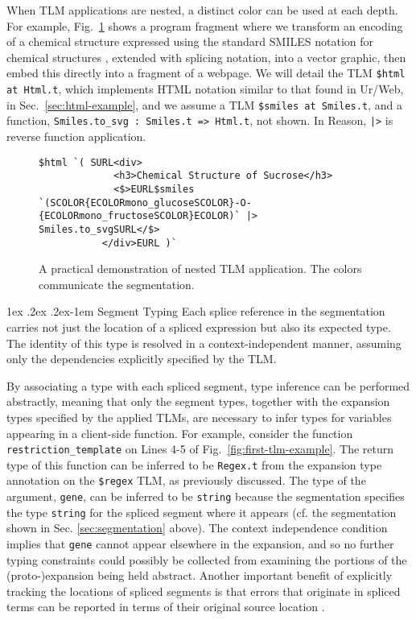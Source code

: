\documentclass[acmsmall]{acmart}
\makeatletter
\renewcommand{\subsubsection}{%
  \@startsection{subsubsection}{3}%
  {\z@}{1ex \@plus .2ex \@minus .2ex}{-1em}%
  {\normalfont\normalsize\bfseries}%
}
\newcommand{\li}[1]{\lstinline[basicstyle=\ttfamily\fontsize{9pt}{1em}\selectfont]{#1}}
\makeatother
\begin{document}
When TLM applications are nested, a distinct color can be used at each depth. For example, Fig.~\ref{fig:nesting-example} shows a program fragment where we transform an encoding of a chemical structure expressed using the standard SMILES notation for chemical structures \cite{anderson1987smiles}, extended with splicing notation, into a vector graphic, then embed this directly into a fragment of a webpage. We will detail the TLM \li{$html at Html.t}, which implements HTML notation similar to that found in Ur/Web, in Sec.~\ref{sec:html-example}, and we assume a TLM \li{$smiles at Smiles.t}, and a function, \li{Smiles.to_svg : Smiles.t => Html.t}, not shown. In Reason, \li{|>} is reverse function application.
\begin{figure}[t]
\vspace{-8px}
\begin{lstlisting}[numbers=none]
  $html `( SURL<div>
             <h3>Chemical Structure of Sucrose</h3>
             <$>EURL$smiles `(SCOLOR{ECOLORmono_glucoseSCOLOR}-O-{ECOLORmono_fructoseSCOLOR}ECOLOR)` |> Smiles.to_svgSURL</$>
           </div>EURL )`
\end{lstlisting}
\vspace{-2px}
\caption{A practical demonstration of nested TLM application. The colors communicate the segmentation.}
\label{fig:nesting-example}
\vspace{-4px}
\end{figure}

\subsubsection{Segment Typing}\label{sec:segment-typing} Each splice reference in the segmentation carries not just the location of a spliced expression but also its expected type. The identity of this type is resolved in a context-independent manner, assuming only the dependencies explicitly specified by the TLM.

By associating a type with each spliced segment, type inference can be performed abstractly, meaning that only the segment types, together with the expansion types specified by the applied TLMs, are necessary to infer types for variables appearing in a client-side function. For example, consider the function \li{restriction_template} on Lines 4-5 of Fig.~\ref{fig:first-tlm-example}. The return type of this function can be inferred to be \li{Regex.t} from the expansion type annotation on the \li{$regex} TLM, as previously discussed. The type of the argument, \li{gene}, can be inferred to be \li{string} because the segmentation specifies the type \li{string} for the spliced segment where it appears (cf. the segmentation shown in Sec. \ref{sec:segmentation} above). The context independence condition implies that \li{gene} cannot appear elsewhere in the expansion, and so no further typing constraints could possibly be collected from examining the portions of the (proto-)expansion being held abstract. Another important benefit of explicitly tracking the locations of spliced segments is that errors that originate in spliced terms can be reported in terms of their original source location \cite{DBLP:journals/jsc/DeursenKT93}.
\end{document}
